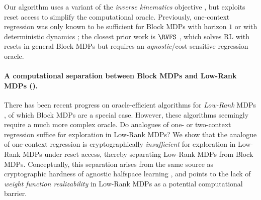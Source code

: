Our algorithm uses a variant of the \emph{inverse kinematics} objective \citep{misra2020kinematic,mhammedi2023representation}, but exploits reset access to simplify the computational oracle. Previously, one-context regression was only known to be sufficient for Block MDPs with horizon $1$ or with deterministic dynamics \citep{golowich2024exploration}; the closest prior work is $\RVFS$ \citep{mhammedi2024power}, which solves RL with resets in general Block MDPs but requires an \emph{agnostic}/cost-sensitive regression oracle.\loose

\paragraph{A computational separation between Block MDPs and Low-Rank MDPs ().} There has been recent progress on oracle-efficient algorithms for \emph{Low-Rank} MDPs \citep{modi2021model,zhang2022efficient,mhammedi2023efficient}, of which Block MDPs are a special case. However, these algorithms seemingly require a much more complex oracle. Do analogues of one- or two-context regression suffice for exploration in Low-Rank MDPs? We show that the analogue of one-context regression is cryptographically \emph{insufficient} for exploration in Low-Rank MDPs under reset access, thereby separating Low-Rank MDPs from Block MDPs. Conceptually, this separation arises from the same source as cryptographic hardness of agnostic halfspace learning \citep{tiegel2023hardness}, and points to the lack of \emph{weight function realizability} in Low-Rank MDPs as a potential computational barrier. 





